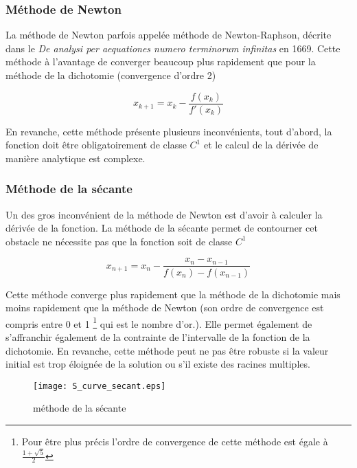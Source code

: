 \subsubsection{Méthode de Newton}
La méthode de Newton parfois appelée méthode de Newton-Raphson, décrite dans le \textit{De analysi per aequationes numero terminorum infinitas} en 1669. Cette méthode à l'avantage de converger beaucoup plus rapidement que pour la méthode de la dichotomie (convergence d'ordre 2)

\begin{equation}
x_{k+1} = x_k - \frac{f(x_k)}{f'(x_k)}
\end{equation}

En revanche, cette méthode présente plusieurs inconvénients, tout d'abord, la fonction doit être obligatoirement de classe $C^1$ et le calcul de la dérivée de manière analytique est complexe.


\subsubsection{Méthode de la sécante}

Un des gros inconvénient de la méthode de Newton est d'avoir à calculer la dérivée de la fonction. La méthode de la sécante permet de contourner cet obstacle ne nécessite pas que la fonction soit de classe $C^1$


\begin{equation}
x_{n+1} = x_n - \frac{x_n - x_{n-1}}{f(x_n) - f(x_{n-1})}
\end{equation}

Cette méthode converge plus rapidement que la méthode de la dichotomie mais moins rapidement que la méthode de Newton (son ordre de convergence est compris entre 0 et 1 \footnote{Pour être plus précis l'ordre de convergence de cette méthode est égale à $\frac{1 + \sqrt{5}}{2}$} qui est le nombre d'or.). Elle permet également de s'affranchir également de la contrainte de l'intervalle de la fonction de la dichotomie. En revanche, cette méthode peut ne pas être robuste si la valeur initial est trop éloignée de la solution ou s'il existe des racines multiples.

\begin{figure}[htb!]
	\centering
	\texttt{[image: S\_curve\_secant.eps]}
	\caption{méthode de la sécante}
	\label{Fig::bench}
\end{figure}


